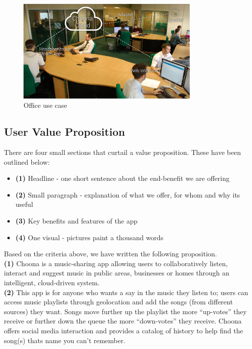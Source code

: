     \begin{figure}[h!]
      \centering
      \includegraphics[width=0.8\textwidth]{./img/office.png}
      \caption{Office use case}
      \label{fig:office}
    \end{figure}

\subsection{User Value Proposition}
There are four small sections that curtail a value proposition.  These have been outlined below:
\begin{itemize}
\item \textbf{(1)} Headline - one short sentence about the end-benefit we are offering
\item \textbf{(2)} Small paragraph - explanation of what we offer, for whom and why its useful
\item \textbf{(3)} Key benefits and features of the app
\item \textbf{(4)} One visual - pictures paint a thousand words
\end{itemize}
Based on the criteria above, we have written the following proposition.\\

\textbf{(1)} Choona is a music-sharing app allowing users to collaboratively listen, interact and suggest music in public areas, businesses or homes through an intelligent, cloud-driven system.  \\

\textbf{(2)} This app is for anyone who wants a say in the music they listen to; users can access music playlists through geolocation and add the songs (from different sources) they want.  Songs move further up the playlist the more ``up-votes'' they receive or further down the queue the more ``down-votes'' they receive.  Choona offers social media interaction and provides a catalog of history to help find the song(s) thats name you can't remember.  \\

